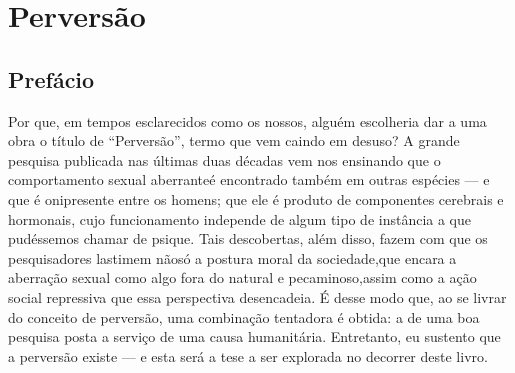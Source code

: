 \begin{comment}
Robert J. Stoller, M.D., é psicanalista e Professor de Psiquiatria
na Universidade da Califórnia na Los Angeles School of Medicine, onde
leciona para estudantes de medicina e alunos residentes da Psiquiatria.
É membro da American Psychoanalytic Association e recebeu seu
treinamento no Los Angeles Psychoanalitic Institute. Stoller é autor de
vários trabalhos focados no desenvolvimento da identidade de gênero
(masculino-feminino). Tem três publicações anteriores sobre o assunto:
\textit{Sex and Gender: On the Development of Masculinity} \textit{and
Femininity} (1968), \textit{Splitting} (1973) e \textit{Sex and Gender
Volume II: The Transsexual} \textit{Experiment} (1975). Adicionalmente
às pesquisas concentradas na identidade de gênero, Stoller tem
demonstrado um inesgotável interesse no campo da pesquisa na área médica.
\end{comment}

\part{Perversão}
\chapter{Prefácio}

Por que, em tempos esclarecidos como os nossos, alguém escolheria dar
a uma obra o título de ``Perversão'', termo
que vem caindo em desuso? A grande pesquisa publicada nas últimas
duas décadas vem nos ensinando que o comportamento sexual aberrante\idxaberr[|(] é
encontrado também em outras espécies --- e que é onipresente entre os
homens; que ele é produto de componentes cerebrais e hormonais, cujo
funcionamento independe de algum tipo de instância a que pudéssemos
chamar de psique. Tais descobertas, além disso, fazem com que os
pesquisadores lastimem não\idxaspec[|(] só a postura\idxpervrespo{} moral\idxrespo{} da sociedade,\idxpervaspec[|(] que encara
a aberração sexual como algo fora do natural e pecaminoso,\idxpecad[|(] assim como a
ação social repressiva que essa perspectiva desencadeia. É desse modo
que, ao se livrar do conceito de perversão, uma combinação tentadora é
obtida: a de uma boa pesquisa posta a serviço de uma causa humanitária.
Entretanto, eu sustento que a perversão existe --- e esta será a tese
a ser explorada no decorrer deste livro.

